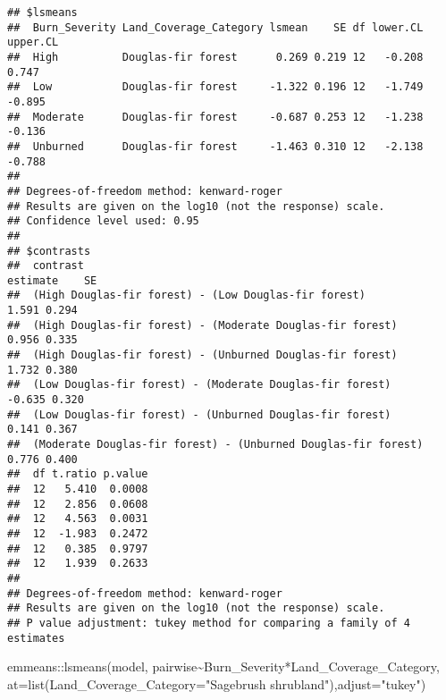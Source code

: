 \documentclass[
]{article}
\newenvironment{Shaded}{\begin{snugshade}}{\end{snugshade}}
\newcommand{\AttributeTok}[1]{\textcolor[rgb]{0.77,0.63,0.00}{#1}}
\newcommand{\FunctionTok}[1]{\textcolor[rgb]{0.00,0.00,0.00}{#1}}
\newcommand{\NormalTok}[1]{#1}
\newcommand{\SpecialCharTok}[1]{\textcolor[rgb]{0.00,0.00,0.00}{#1}}
\newcommand{\StringTok}[1]{\textcolor[rgb]{0.31,0.60,0.02}{#1}}
\begin{document}
\begin{verbatim}
## $lsmeans
##  Burn_Severity Land_Coverage_Category lsmean    SE df lower.CL upper.CL
##  High          Douglas-fir forest      0.269 0.219 12   -0.208    0.747
##  Low           Douglas-fir forest     -1.322 0.196 12   -1.749   -0.895
##  Moderate      Douglas-fir forest     -0.687 0.253 12   -1.238   -0.136
##  Unburned      Douglas-fir forest     -1.463 0.310 12   -2.138   -0.788
## 
## Degrees-of-freedom method: kenward-roger 
## Results are given on the log10 (not the response) scale. 
## Confidence level used: 0.95 
## 
## $contrasts
##  contrast                                                      estimate    SE
##  (High Douglas-fir forest) - (Low Douglas-fir forest)             1.591 0.294
##  (High Douglas-fir forest) - (Moderate Douglas-fir forest)        0.956 0.335
##  (High Douglas-fir forest) - (Unburned Douglas-fir forest)        1.732 0.380
##  (Low Douglas-fir forest) - (Moderate Douglas-fir forest)        -0.635 0.320
##  (Low Douglas-fir forest) - (Unburned Douglas-fir forest)         0.141 0.367
##  (Moderate Douglas-fir forest) - (Unburned Douglas-fir forest)    0.776 0.400
##  df t.ratio p.value
##  12   5.410  0.0008
##  12   2.856  0.0608
##  12   4.563  0.0031
##  12  -1.983  0.2472
##  12   0.385  0.9797
##  12   1.939  0.2633
## 
## Degrees-of-freedom method: kenward-roger 
## Results are given on the log10 (not the response) scale. 
## P value adjustment: tukey method for comparing a family of 4 estimates
\end{verbatim}

\begin{Shaded}
\begin{Highlighting}[]
\NormalTok{emmeans}\SpecialCharTok{::}\FunctionTok{lsmeans}\NormalTok{(model, pairwise}\SpecialCharTok{\textasciitilde{}}\NormalTok{Burn\_Severity}\SpecialCharTok{*}\NormalTok{Land\_Coverage\_Category, }\AttributeTok{at=}\FunctionTok{list}\NormalTok{(}\AttributeTok{Land\_Coverage\_Category=}\StringTok{"Sagebrush shrubland"}\NormalTok{),}\AttributeTok{adjust=}\StringTok{"tukey"}\NormalTok{) }
\end{Highlighting}
\end{Shaded}
\end{document}

